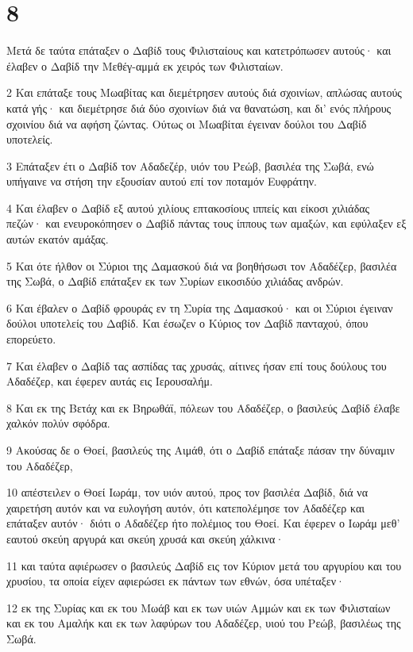 \chapter{8}

\par Μετά δε ταύτα επάταξεν ο Δαβίδ τους Φιλισταίους και κατετρόπωσεν αυτούς· και έλαβεν ο Δαβίδ την Μεθέγ-αμμά εκ χειρός των Φιλισταίων.
\par 2 Και επάταξε τους Μωαβίτας και διεμέτρησεν αυτούς διά σχοινίων, απλώσας αυτούς κατά γής· και διεμέτρησε διά δύο σχοινίων διά να θανατώση, και δι' ενός πλήρους σχοινίου διά να αφήση ζώντας. Ούτως οι Μωαβίται έγειναν δούλοι του Δαβίδ υποτελείς.
\par 3 Επάταξεν έτι ο Δαβίδ τον Αδαδεζέρ, υιόν του Ρεώβ, βασιλέα της Σωβά, ενώ υπήγαινε να στήση την εξουσίαν αυτού επί τον ποταμόν Ευφράτην.
\par 4 Και έλαβεν ο Δαβίδ εξ αυτού χιλίους επτακοσίους ιππείς και είκοσι χιλιάδας πεζών· και ενευροκόπησεν ο Δαβίδ πάντας τους ίππους των αμαξών, και εφύλαξεν εξ αυτών εκατόν αμάξας.
\par 5 Και ότε ήλθον οι Σύριοι της Δαμασκού διά να βοηθήσωσι τον Αδαδέζερ, βασιλέα της Σωβά, ο Δαβίδ επάταξεν εκ των Συρίων εικοσιδύο χιλιάδας ανδρών.
\par 6 Και έβαλεν ο Δαβίδ φρουράς εν τη Συρία της Δαμασκού· και οι Σύριοι έγειναν δούλοι υποτελείς του Δαβίδ. Και έσωζεν ο Κύριος τον Δαβίδ πανταχού, όπου επορεύετο.
\par 7 Και έλαβεν ο Δαβίδ τας ασπίδας τας χρυσάς, αίτινες ήσαν επί τους δούλους του Αδαδέζερ, και έφερεν αυτάς εις Ιερουσαλήμ.
\par 8 Και εκ της Βετάχ και εκ Βηρωθάϊ, πόλεων του Αδαδέζερ, ο βασιλεύς Δαβίδ έλαβε χαλκόν πολύν σφόδρα.
\par 9 Ακούσας δε ο Θοεί, βασιλεύς της Αιμάθ, ότι ο Δαβίδ επάταξε πάσαν την δύναμιν του Αδαδέζερ,
\par 10 απέστειλεν ο Θοεί Ιωράμ, τον υιόν αυτού, προς τον βασιλέα Δαβίδ, διά να χαιρετήση αυτόν και να ευλογήση αυτόν, ότι κατεπολέμησε τον Αδαδέζερ και επάταξεν αυτόν· διότι ο Αδαδέζερ ήτο πολέμιος του Θοεί. Και έφερεν ο Ιωράμ μεθ' εαυτού σκεύη αργυρά και σκεύη χρυσά και σκεύη χάλκινα·
\par 11 και ταύτα αφιέρωσεν ο βασιλεύς Δαβίδ εις τον Κύριον μετά του αργυρίου και του χρυσίου, τα οποία είχεν αφιερώσει εκ πάντων των εθνών, όσα υπέταξεν·
\par 12 εκ της Συρίας και εκ του Μωάβ και εκ των υιών Αμμών και εκ των Φιλισταίων και εκ του Αμαλήκ και εκ των λαφύρων του Αδαδέζερ, υιού του Ρεώβ, βασιλέως της Σωβά.
